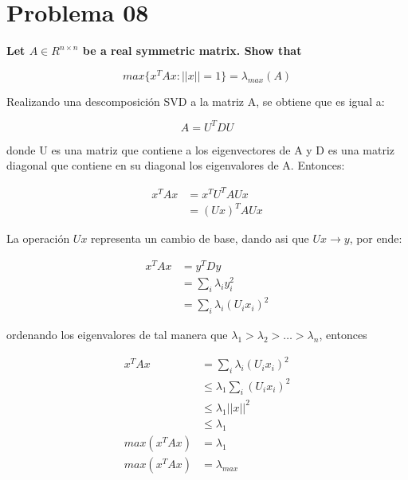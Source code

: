 \section*{Problema 08}

\textbf{Let $A \in R^{n\times n}$ be a real symmetric matrix. Show that}

\begin{equation*}
    max\{ x^TAx: ||x||=1\}=\lambda_{max}(A)
\end{equation*}

Realizando una descomposición SVD a la matriz A, se obtiene que es igual a:

\begin{equation*}
    A = U^TDU
\end{equation*}

donde U es una matriz que contiene a los eigenvectores de A y D es una matriz diagonal que contiene en su diagonal los eigenvalores de A. Entonces:

\begin{align*}
    x^TAx & = x^TU^T A Ux \\
          & = (Ux)^T A Ux
\end{align*}

La operación $Ux$ representa un cambio de base, dando asi que $Ux\rightarrow y$, por ende:

\begin{align*}
    x^TAx & = y^TDy                       \\
          & = \sum_i \lambda_i y_i^2      \\
          & = \sum_i \lambda_i (U_ix_i)^2
\end{align*}

ordenando los eigenvalores de tal manera que $\lambda_1 > \lambda_2 > \dots > \lambda_n$, entonces


\begin{align*}
    x^TAx      & =\sum_i \lambda_i (U_ix_i)^2     \\
               & \leq \lambda_1 \sum_i (U_ix_i)^2 \\
               & \leq \lambda_1 ||x||^2           \\
               & \leq \lambda_1                   \\
    max(x^TAx) & = \lambda_1                      \\
    max(x^TAx) & = \lambda_{max}
\end{align*}
